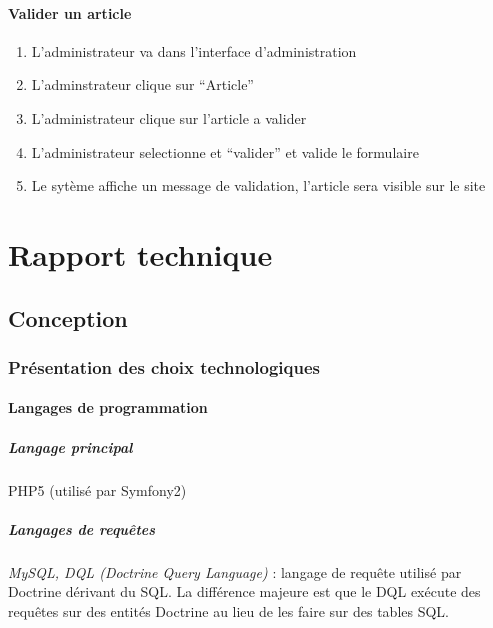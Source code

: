 \documentclass[a4paper,12pt, notitlepage]{report}
\begin{document}
\subsection{Valider un article}
\begin{enumerate}
    \item L’administrateur va dans l’interface d’administration
    \item L’adminstrateur clique sur “Article”
    \item L’administrateur  clique sur l’article a valider
    \item L’administrateur selectionne et “valider” et valide le formulaire 
    \item Le sytème affiche un message de validation, l’article sera visible sur le site
\end{enumerate}











\part{Rapport technique}



\chapter{Conception}


\section{Présentation des choix technologiques}
\subsection{Langages de programmation}
\subsubsection{Langage principal}
PHP5 (utilisé par Symfony2)
\subsubsection{Langages de requêtes}
\emph{MySQL, DQL (Doctrine Query Language)} : langage de requête utilisé par Doctrine dérivant du SQL. La différence majeure est que le DQL exécute des requêtes sur des entités Doctrine au lieu de les faire sur des tables SQL.
\end{document}

